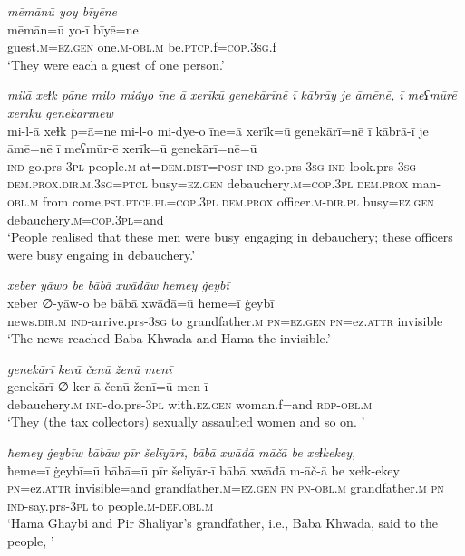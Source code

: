 \ea \label{BP.44}
\textit{mēmānū yoy bīyēne} \\ 
\gll mēmān=ū yo-ī bīyē=ne \\ 
 guest\textsc{.m}\textsc{=ez.gen} one\textsc{.m}\textsc{-obl}\textsc{.m} be\textsc{.ptcp}.f\textsc{=cop}\textsc{.3sg}.f \\ 
\glt `They were each a guest of one person.'
\z 
 
\ea \label{BP.45}
\textit{milā xeɫk pāne milo miđyo īne ā xerīkū genekārīnē ī kābrāy je āmēnē, ī meʕmūrē xerīkū genekārīnēw} \\ 
\gll mi-l-ā xeɫk p=ā=ne mi-l-o mi-đye-o īne=ā xerīk=ū genekārī=nē ī kābrā-ī je āmē=nē ī meʕmūr-ē xerīk=ū genekārī=nē=ū \\ 
 \textsc{ind-}go.prs\textsc{-3pl} people\textsc{.m} at=\textsc{dem.dist}\textsc{=\textsc{post}} \textsc{ind-}go.prs\textsc{-3sg} \textsc{ind-}look.prs\textsc{-3sg} \textsc{dem.prox}\textsc{.dir}\textsc{.m}\textsc{.3sg}=\textsc{ptcl} busy\textsc{=ez.gen} debauchery\textsc{.m}\textsc{=cop}\textsc{.3pl} \textsc{dem.prox} man\textsc{-obl}\textsc{.m} from come\textsc{.pst}\textsc{.ptcp}\textsc{.pl}\textsc{=cop}\textsc{.3pl} \textsc{dem.prox} officer\textsc{.m}\textsc{-dir}\textsc{.pl} busy\textsc{=ez.gen} debauchery\textsc{.m}\textsc{=cop}\textsc{.3pl}=and \\ 
\glt `People realised that these men were busy engaging in debauchery; these officers were busy engaing in debauchery.'
\z 
 
\ea \label{BP.46}
\textit{xeber yāwo be bābā xwāđāw ħemey ġeybī} \\ 
\gll xeber ∅-yāw-o be bābā xwāđā=ū ħeme=ī ġeybī \\ 
 news\textsc{.dir}\textsc{.m} \textsc{ind-}arrive.prs\textsc{-3sg} to grandfather\textsc{.m} \textsc{pn}\textsc{=ez.gen} \textsc{pn}=ez.\textsc{attr} invisible \\ 
\glt `The news reached Baba Khwada and Hama the invisible.'
\z 
 
\ea \label{BP.49}
\textit{genekārī kerā čenū ženū menī} \\ 
\gll genekārī ∅-ker-ā čenū ženī=ū men-ī \\ 
 debauchery\textsc{.m} \textsc{ind-}do.prs\textsc{-3pl} with\textsc{.ez.gen} woman.f=and \textsc{rdp}\textsc{-obl}\textsc{.m} \\ 
\glt `They (the tax collectors) sexually assaulted women and so on. '
\z 
 
\ea \label{BP.51}
\textit{ħemey ġeybīw bābāw pīr šelīyārī, bābā xwāđā māčā be xeɫkekey,} \\ 
\gll ħeme=ī ġeybī=ū bābā=ū pīr šelīyār-ī bābā xwāđā m-āč-ā be xeɫk-ekey \\ 
 \textsc{pn}=ez.\textsc{attr} invisible=and grandfather\textsc{.m}\textsc{=ez.gen} \textsc{pn} \textsc{pn}\textsc{-obl}\textsc{.m} grandfather\textsc{.m} \textsc{pn} \textsc{ind-}say.prs\textsc{-3pl} to people\textsc{.m}\textsc{-def}\textsc{.obl}\textsc{.m} \\ 
\glt `Hama Ghaybi and Pir Shaliyar’s grandfather, i.e., Baba Khwada, said to the people, '
\z 
 
